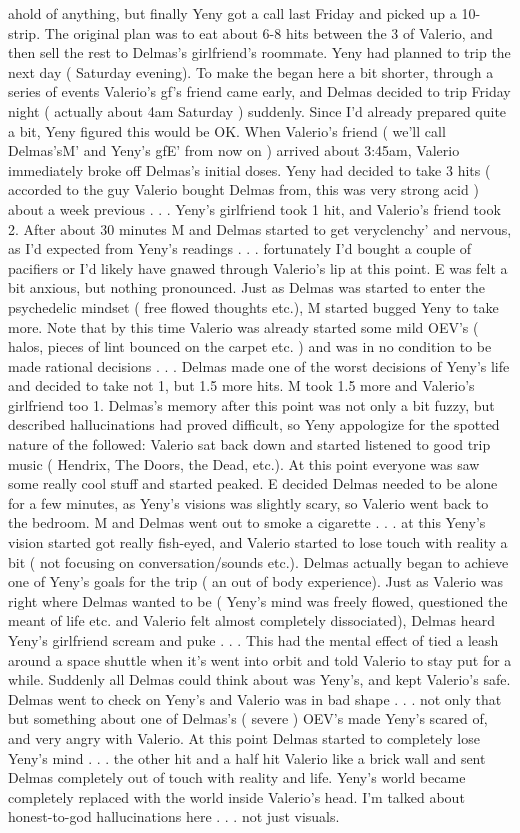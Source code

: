 \documentclass[12pt]{book}
\begin{document}
ahold of anything, but finally Yeny got a call last Friday and picked up a 10-strip. The original plan was to eat about 6-8 hits between the 3 of Valerio, and then sell the rest to Delmas's girlfriend's roommate. Yeny had planned to trip the next day ( Saturday evening). To make the began here a bit shorter, through a series of events Valerio's gf's friend came early, and Delmas decided to trip Friday night ( actually about 4am Saturday ) suddenly. Since I'd already prepared quite a bit, Yeny figured this would be OK. When Valerio's friend ( we'll call Delmas'sM' and Yeny's gfE' from now on ) arrived about 3:45am, Valerio immediately broke off Delmas's initial doses. Yeny had decided to take 3 hits ( accorded to the guy Valerio bought Delmas from, this was very strong acid ) about a week previous . . .  Yeny's girlfriend took 1 hit, and Valerio's friend took 2. After about 30 minutes M and Delmas started to get veryclenchy' and nervous, as I'd expected from Yeny's readings . . .  fortunately I'd bought a couple of pacifiers or I'd likely have gnawed through Valerio's lip at this point. E was felt a bit anxious, but nothing pronounced. Just as Delmas was started to enter the psychedelic mindset ( free flowed thoughts etc.), M started bugged Yeny to take more. Note that by this time Valerio was already started some mild OEV's ( halos, pieces of lint bounced on the carpet etc. ) and was in no condition to be made rational decisions . . .  Delmas made one of the worst decisions of Yeny's life and decided to take not 1, but 1.5 more hits. M took 1.5 more and Valerio's girlfriend too 1. Delmas's memory after this point was not only a bit fuzzy, but described hallucinations had proved difficult, so Yeny appologize for the spotted nature of the followed: Valerio sat back down and started listened to good trip music ( Hendrix, The Doors, the Dead, etc.). At this point everyone was saw some really cool stuff and started peaked. E decided Delmas needed to be alone for a few minutes, as Yeny's visions was slightly scary, so Valerio went back to the bedroom. M and Delmas went out to smoke a cigarette . . .  at this Yeny's vision started got really fish-eyed, and Valerio started to lose touch with reality a bit ( not focusing on conversation/sounds etc.). Delmas actually began to achieve one of Yeny's goals for the trip ( an out of body experience). Just as Valerio was right where Delmas wanted to be ( Yeny's mind was freely flowed, questioned the meant of life etc. and Valerio felt almost completely dissociated), Delmas heard Yeny's girlfriend scream and puke . . .  This had the mental effect of tied a leash around a space shuttle when it's went into orbit and told Valerio to stay put for a while. Suddenly all Delmas could think about was Yeny's, and kept Valerio's safe. Delmas went to check on Yeny's and Valerio was in bad shape . . .  not only that but something about one of Delmas's ( severe ) OEV's made Yeny's scared of, and very angry with Valerio. At this point Delmas started to completely lose Yeny's mind . . .  the other hit and a half hit Valerio like a brick wall and sent Delmas completely out of touch with reality and life. Yeny's world became completely replaced with the world inside Valerio's head. I'm talked about honest-to-god hallucinations here . . .  not just visuals. 
\end{document}
